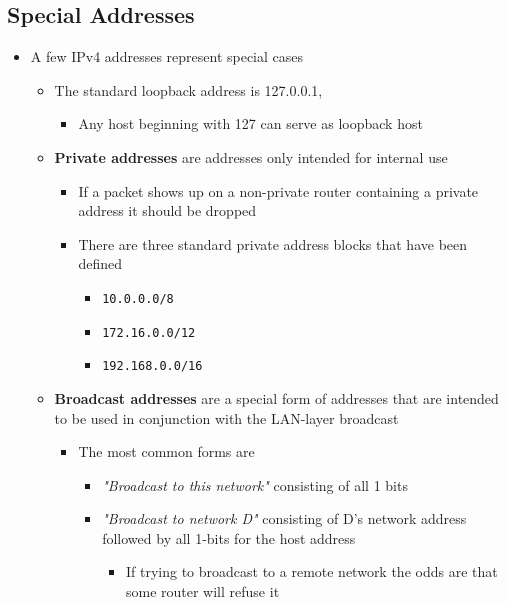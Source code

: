 \documentclass[11pt]{article}
\providecommand{\tightlist}{%
      \setlength{\itemsep}{0pt}\setlength{\parskip}{0pt}}
\begin{document}
    \subsection{Special Addresses}\label{special-addresses}

\begin{itemize}
\tightlist
\item
  A few IPv4 addresses represent special cases

  \begin{itemize}
  \tightlist
  \item
    The standard loopback address is 127.0.0.1,

    \begin{itemize}
    \tightlist
    \item
      Any host beginning with 127 can serve as loopback host
    \end{itemize}
  \item
    \textbf{Private addresses} are addresses only intended for internal
    use

    \begin{itemize}
    \tightlist
    \item
      If a packet shows up on a non-private router containing a private
      address it should be dropped
    \item
      There are three standard private address blocks that have been
      defined

      \begin{itemize}
      \tightlist
      \item
        \texttt{10.0.0.0/8}
      \item
        \texttt{172.16.0.0/12}
      \item
        \texttt{192.168.0.0/16}
      \end{itemize}
    \end{itemize}
  \item
    \textbf{Broadcast addresses} are a special form of addresses that
    are intended to be used in conjunction with the LAN-layer broadcast

    \begin{itemize}
    \tightlist
    \item
      The most common forms are

      \begin{itemize}
      \tightlist
      \item
        \emph{"Broadcast to this network"} consisting of all 1 bits
      \item
        \emph{"Broadcast to network D"} consisting of D's network
        address followed by all 1-bits for the host address

        \begin{itemize}
        \tightlist
        \item
          If trying to broadcast to a remote network the odds are that
          some router will refuse it
        \end{itemize}
      \end{itemize}
    \end{itemize}
  \end{itemize}
\end{itemize}
\end{document}
